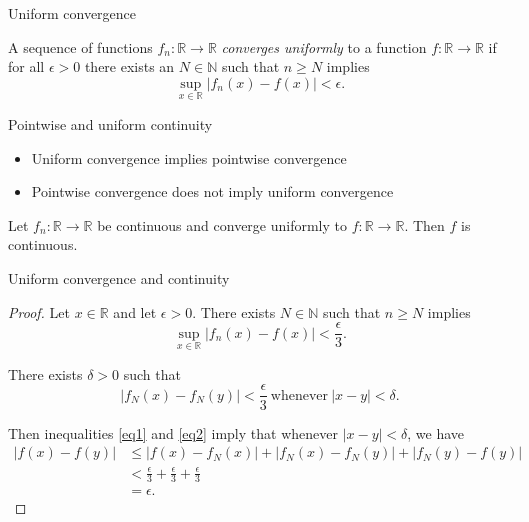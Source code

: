 \documentclass{beamer}		%
\begin{document}
\begin{frame}{Uniform convergence}	

\begin{definition}	%

A sequence of functions $f_n \colon \mathbb{R} \to \mathbb{R}$ \emph{converges uniformly} to a function $f \colon \mathbb{R} \to \mathbb{R}$ if for all $\epsilon > 0$ there exists an $N \in \mathbb{N}$ such that $n \geq N$ implies 
\[
\sup_{x \in \mathbb{R}} |f_n(x) - f(x)| < \epsilon.
\]

\end{definition}

\pause	%

\begin{block}{Pointwise and uniform continuity} %

\begin{itemize}
\item Uniform convergence implies pointwise convergence
\item Pointwise convergence does not imply uniform convergence
\end{itemize}

\end{block}

\pause

\begin{theorem}
Let $f_n \colon\mathbb{R} \to \mathbb{R}$ be continuous and converge uniformly to $f \colon \mathbb{R} \to \mathbb{R}$.  Then $f$ is continuous.
\end{theorem}

\end{frame}

\begin{frame}{Uniform convergence and continuity}

\begin{proof}
Let $x \in \mathbb{R}$ and let $\epsilon > 0$.  There exists $N \in \mathbb{N}$ such that $n \geq N$ implies
\begin{equation}
\label{eq1}
\sup_{x \in \mathbb{R}} |f_n(x) - f(x)| < \frac{\epsilon}{3}.
\end{equation}

There exists $\delta > 0$ such that 
\begin{equation}
\label{eq2}
|f_N(x) - f_N(y) | < \frac{\epsilon}{3}\ \mbox{whenever}\ |x-y| < \delta.
\end{equation}

Then inequalities \eqref{eq1} and \eqref{eq2} imply that whenever $|x-y | < \delta$, we have 
\begin{align*}
|f(x) - f(y)| 
& \leq |f(x) - f_N(x)| + |f_N(x) - f_N(y)| + | f_N(y) - f(y) | \\
& < \frac{\epsilon}{3} + \frac{\epsilon}{3} + \frac{\epsilon}{3} \\
& = \epsilon.
\end{align*} 
\end{proof}

\end{frame}
\end{document}
